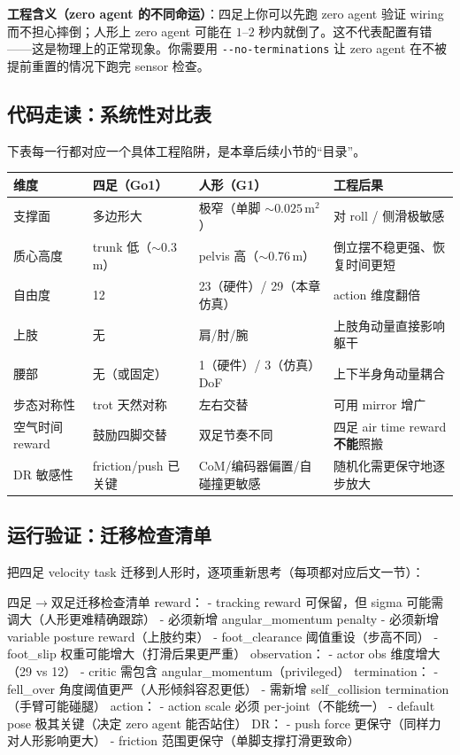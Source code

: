 \textbf{工程含义（zero agent 的不同命运）}：四足上你可以先跑 zero agent 验证 wiring 而不担心摔倒；人形上 zero agent 可能在 $1$--$2$ 秒内就倒了。这不代表配置有错——这是物理上的正常现象。你需要用 \verb|--no-terminations| 让 zero agent 在不被提前重置的情况下跑完 sensor 检查。

\subsection{代码走读：系统性对比表}
下表每一行都对应一个具体工程陷阱，是本章后续小节的“目录”。

\begin{center}
\small
\begin{tabular}{p{2.0cm}p{2.4cm}p{3.0cm}p{4.0cm}}
\hline
维度 & 四足（Go1） & 人形（G1） & 工程后果 \\
\hline
支撑面 & 多边形大 & 极窄（单脚 $\sim 0.025\,\mathrm{m}^2$） & 对 roll / 侧滑极敏感 \\
质心高度 & trunk 低（$\sim 0.3$\,m） & pelvis 高（$\sim 0.76$\,m） & 倒立摆不稳更强、恢复时间更短 \\
自由度 & 12 & 23（硬件）/ 29（本章仿真） & action 维度翻倍 \\
上肢 & 无 & 肩/肘/腕 & 上肢角动量直接影响躯干 \\
腰部 & 无（或固定） & 1（硬件）/ 3（仿真）DoF & 上下半身角动量耦合 \\
步态对称性 & trot 天然对称 & 左右交替 & 可用 mirror 增广 \\
空气时间 reward & 鼓励四脚交替 & 双足节奏不同 & 四足 air time reward \textbf{不能}照搬 \\
DR 敏感性 & friction/push 已关键 & CoM/编码器偏置/自碰撞更敏感 & 随机化需更保守地逐步放大 \\
\hline
\end{tabular}
\end{center}

\subsection{运行验证：迁移检查清单}
把四足 velocity task 迁移到人形时，逐项重新思考（每项都对应后文一节）：

\begin{codebox}[text]{四足$\to$双足迁移检查清单}
reward：
  - tracking reward 可保留，但 sigma 可能需调大（人形更难精确跟踪）
  - 必须新增 angular_momentum penalty
  - 必须新增 variable posture reward（上肢约束）
  - foot_clearance 阈值重设（步高不同）
  - foot_slip 权重可能增大（打滑后果更严重）
observation：
  - actor obs 维度增大（29 vs 12）
  - critic 需包含 angular_momentum（privileged）
termination：
  - fell_over 角度阈值更严（人形倾斜容忍更低）
  - 需新增 self_collision termination（手臂可能碰腿）
action：
  - action scale 必须 per-joint（不能统一）
  - default pose 极其关键（决定 zero agent 能否站住）
DR：
  - push force 更保守（同样力对人形影响更大）
  - friction 范围更保守（单脚支撑打滑更致命）
\end{codebox}

